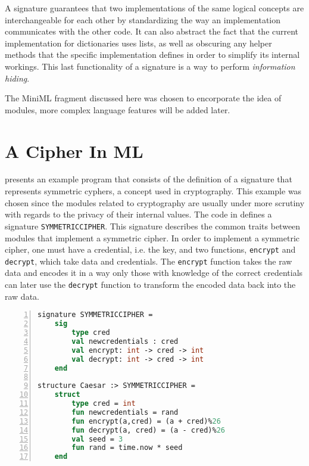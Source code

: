 \documentclass[10pt,a4paper,master=cws, masteroption=ai,english,inputenc=utf8]{kulemt}
\begin{document}
A signature guarantees that two implementations of the same logical concepts are interchangeable for each other by standardizing the way an implementation communicates with the other code.
It can also abstract the fact that the current implementation for dictionaries uses lists, as well as obscuring any helper methods that the specific implementation defines in order to simplify its internal workings.
This last functionality of a signature is a way to perform \emph{information hiding}.


The \mbox{MiniML} fragment discussed here was chosen to encorporate the idea of modules, more complex language features will be added later.

\section{A Cipher In ML\label{sec:MLExample}}
 presents an example program that consists of the definition of a signature that represents symmetric cyphers, a concept used in cryptography.
This example was chosen since the modules related to cryptography are usually under more scrutiny with regards to the privacy of their internal values.
The code in  defines a signature \texttt{SYMMETRICCIPHER}.
This signature describes the common traits between modules that implement a symmetric cipher.
In order to implement a symmetric cipher, one must have a credential, i.e. the key, and two functions, \texttt{encrypt} and \texttt{decrypt}, which take data and credentials.
The \texttt{encrypt} function takes the raw data and encodes it in a way only those with knowledge of the correct credentials can later use the \texttt{decrypt} function to transform the encoded data back into the raw data.

\begin{lstlisting}[frame=single, language=ML,numbers=left, label=code:Example, caption=Example of a security sensitive module specifying and implementing a symmetric cypher.]
signature SYMMETRICCIPHER =
    sig 
        type cred
        val newcredentials : cred
        val encrypt: int -> cred -> int
        val decrypt: int -> cred -> int
    end

structure Caesar :> SYMMETRICCIPHER =
    struct
        type cred = int
        fun newcredentials = rand
        fun encrypt(a,cred) = (a + cred)%26
        fun decrypt(a, cred) = (a - cred)%26
        val seed = 3
        fun rand = time.now * seed
    end
\end{lstlisting}
\end{document}
